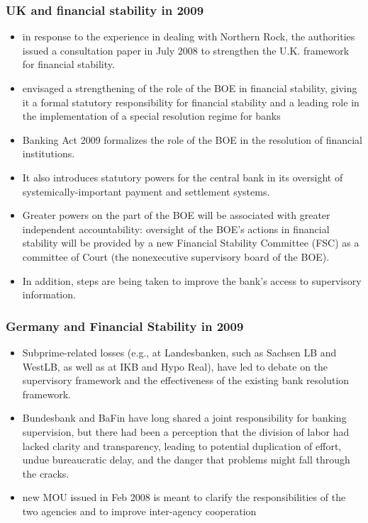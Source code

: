 \documentclass[11pt]{beamer}
\begin{document}

\begin{frame}
\frametitle{UK and financial stability in 2009}
\begin{itemize}
\item  in response to the experience in dealing with Northern Rock, the authorities issued a consultation paper in July 2008 to strengthen the U.K. framework for financial stability.
\item envisaged a strengthening of the role of the BOE in financial stability, giving it a formal statutory responsibility for financial stability and a leading role in the implementation of a special resolution regime for banks
\item Banking Act 2009 formalizes the role of the BOE in the resolution of financial institutions.
\item It also introduces statutory powers for the central bank in its oversight of systemically-important payment and settlement systems.
\item Greater powers on the part of the BOE will be associated with greater independent accountability: oversight of the BOE’s actions in financial stability will be provided by a new Financial Stability Committee (FSC) as a committee of Court (the nonexecutive supervisory board of the BOE).
\item In addition, steps are being taken to improve the bank’s access to supervisory information.
\end{itemize}
\end{frame}

\begin{frame}
\frametitle{Germany and Financial Stability in 2009}

\begin{itemize}
\item Subprime-related losses (e.g., at Landesbanken, such as Sachsen LB and WestLB, as well as at IKB and Hypo Real), have led to debate on the supervisory framework and the effectiveness of the existing bank resolution framework.
\item Bundesbank and BaFin have long shared a joint responsibility for banking supervision, but there had been a perception that the division of labor had lacked clarity and transparency, leading to potential duplication of effort, undue bureaucratic delay, and the danger that problems might fall through the cracks.
\item new MOU issued in Feb 2008 is meant to clarify the responsibilities of the two agencies and to improve inter-agency cooperation

\end{itemize}

\end{frame}
\end{document}
